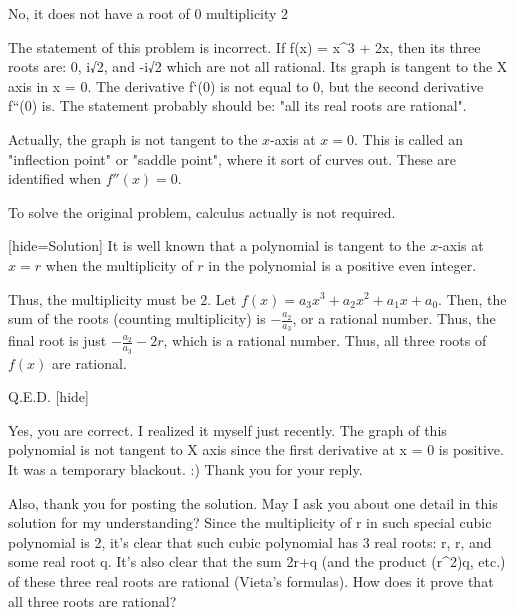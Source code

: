 \begin{solution}
	No, it does not have a root of 0 multiplicity 2
\end{solution}



\begin{solution}
	\begin{tcolorbox}The statement of this problem is incorrect. If f(x) = x^3 + 2x, then its three roots are: 0, i√2, and -i√2 which are not all rational. Its graph is tangent to the X axis in x = 0. The derivative f`(0) is not equal to 0, but the second derivative f``(0) is. The statement probably should be: "all its real roots are rational".\end{tcolorbox}

Actually, the graph is not tangent to the $x$-axis at $x=0$. This is called an "inflection point" or "saddle point", where it sort of curves out. These are identified when $f''(x)=0$.

To solve the original problem, calculus actually is not required.

[hide=Solution]
It is well known that a polynomial is tangent to the $x$-axis at $x=r$ when the multiplicity of $r$ in the polynomial is a positive even integer.

Thus, the multiplicity must be $2$. Let $f(x)=a_3x^3+a_2x^2+a_1x+a_0$. Then, the sum of the roots (counting multiplicity) is $-\frac{a_2}{a_3}$, or a rational number. Thus, the final root is just $-\frac{a_2}{a_3}-2r$, which is a rational number. Thus, all three roots of $f(x)$ are rational.

Q.E.D.
[\/hide]
\end{solution}



\begin{solution}
	Yes, you are correct. I realized it myself just recently. The graph of this polynomial is not tangent to X axis since the first derivative at x = 0 is positive. It was a temporary blackout. :) 
Thank you for your reply.

Also, thank you for posting the solution. May I ask you about one detail in this solution for my understanding? 
Since the multiplicity of r in such special cubic polynomial is 2, it's clear that such cubic polynomial has 3 real roots: r, r, and some real root q. It's also clear that the sum 2r+q (and the product (r^2)q, etc.) of these three real roots are rational (Vieta's formulas). How does it prove that all three roots are rational?
\end{solution}



